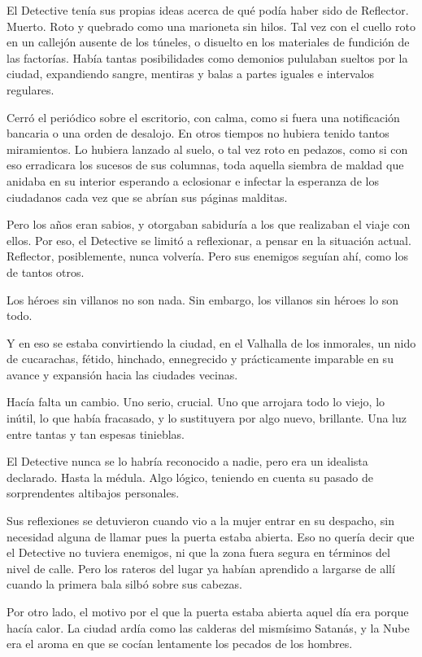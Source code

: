 El Detective tenía sus propias ideas acerca de qué podía haber sido de Reflector. Muerto. Roto y quebrado como una marioneta sin hilos. Tal vez con el cuello roto en un callejón ausente de los túneles, o disuelto en los materiales de fundición de las factorías. Había tantas posibilidades como demonios pululaban sueltos por la ciudad, expandiendo sangre, mentiras y balas a partes iguales e intervalos regulares.

Cerró el periódico sobre el escritorio, con calma, como si fuera una notificación bancaria o una orden de desalojo. En otros tiempos no hubiera tenido tantos miramientos. Lo hubiera lanzado al suelo, o tal vez roto en pedazos, como si con eso erradicara los sucesos de sus columnas, toda aquella siembra de maldad que anidaba en su interior esperando a eclosionar e infectar la esperanza de los ciudadanos cada vez que se abrían sus páginas malditas.

Pero los años eran sabios, y otorgaban sabiduría a los que realizaban el viaje con ellos. Por eso, el Detective se limitó a reflexionar, a pensar en la situación actual. Reflector, posiblemente, nunca volvería. Pero sus enemigos seguían ahí, como los de tantos otros.

Los héroes sin villanos no son nada. Sin embargo, los villanos sin héroes lo son todo.

Y en eso se estaba convirtiendo la ciudad, en el Valhalla de los inmorales, un nido de cucarachas, fétido, hinchado, ennegrecido y prácticamente imparable en su avance y expansión hacia las ciudades vecinas.

Hacía falta un cambio. Uno serio, crucial. Uno que arrojara todo lo viejo, lo inútil, lo que había fracasado, y lo sustituyera por algo nuevo, brillante. Una luz entre tantas y tan espesas tinieblas.

El Detective nunca se lo habría reconocido a nadie, pero era un idealista declarado. Hasta la médula. Algo lógico, teniendo en cuenta su pasado de sorprendentes altibajos personales.

Sus reflexiones se detuvieron cuando vio a la mujer entrar en su despacho, sin necesidad alguna de llamar pues la puerta estaba abierta. Eso no quería decir que el Detective no tuviera enemigos, ni que la zona fuera segura en términos del nivel de calle. Pero los rateros del lugar ya habían aprendido a largarse de allí cuando la primera bala silbó sobre sus cabezas.

Por otro lado, el motivo por el que la puerta estaba abierta aquel día era porque hacía calor. La ciudad ardía como las calderas del mismísimo Satanás, y la Nube era el aroma en que se cocían lentamente los pecados de los hombres.

